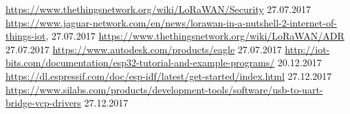 \documentclass[11pt,english,german]{report}
\theoremstyle{definition}
\begin{document}
\begin{thebibliography}{1}
	 \url{https://www.thethingsnetwork.org/wiki/LoRaWAN/Security} 27.07.2017
	 \url{https://www.jaguar-network.com/en/news/lorawan-in-a-nutshell-2-internet-of-things-iot}, 27.07.2017
	 \url{https://www.thethingsnetwork.org/wiki/LoRaWAN/ADR} 27.07.2017
	 \url{https://www.autodesk.com/products/eagle} 27.07.2017
	 \url{http://iot-bits.com/documentation/esp32-tutorial-and-example-programs/} 20.12.2017
	 \url{https://dl.espressif.com/doc/esp-idf/latest/get-started/index.html} 27.12.2017
	 \url{https://www.silabs.com/products/development-tools/software/usb-to-uart-bridge-vcp-drivers} 27.12.2017
\end{thebibliography}
\end{document}

